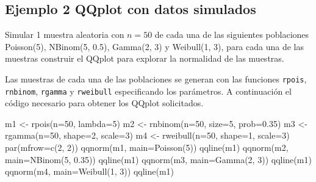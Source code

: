 \documentclass[
]{book}
\makeatletter
\newenvironment{Shaded}{\begin{snugshade}}{\end{snugshade}}
\newcommand{\AttributeTok}[1]{\textcolor[rgb]{0.77,0.63,0.00}{#1}}
\newcommand{\DecValTok}[1]{\textcolor[rgb]{0.00,0.00,0.81}{#1}}
\newcommand{\FloatTok}[1]{\textcolor[rgb]{0.00,0.00,0.81}{#1}}
\newcommand{\FunctionTok}[1]{\textcolor[rgb]{0.00,0.00,0.00}{#1}}
\newcommand{\NormalTok}[1]{#1}
\newcommand{\OtherTok}[1]{\textcolor[rgb]{0.56,0.35,0.01}{#1}}
\newcommand{\StringTok}[1]{\textcolor[rgb]{0.31,0.60,0.02}{#1}}
\newenvironment{kframe}{%
\medskip{}
\setlength{\fboxsep}{.8em}
 \def\at@end@of@kframe{}%
 \ifinner\ifhmode%
  \def\at@end@of@kframe{\end{minipage}}%
  \begin{minipage}{\columnwidth}%
 \fi\fi%
 \def\FrameCommand##1{\hskip\@totalleftmargin \hskip-\fboxsep
 \colorbox{shadecolor}{##1}\hskip-\fboxsep
     \hskip-\linewidth \hskip-\@totalleftmargin \hskip\columnwidth}%
 \MakeFramed {\advance\hsize-\width
   \@totalleftmargin\z@ \linewidth\hsize
   \@setminipage}}%
 {\par\unskip\endMakeFramed%
 \at@end@of@kframe}
\renewenvironment{Shaded}{\begin{kframe}}{\end{kframe}}
\makeatother
\begin{document}
\hypertarget{ejemplo-2-qqplot-con-datos-simulados}{%
\subsection*{Ejemplo 2 QQplot con datos simulados}\label{ejemplo-2-qqplot-con-datos-simulados}}

Simular 1 muestra aleatoria con \(n=50\) de cada una de las siguientes poblaciones Poisson(5), NBinom(5, 0.5), Gamma(2, 3) y Weibull(1, 3), para cada una de las muestras construir el QQplot para explorar la normalidad de las muestras.

Las muestras de cada una de las poblaciones se generan con las funciones \texttt{rpois}, \texttt{rnbinom}, \texttt{rgamma} y \texttt{rweibull} especificando los parámetros. A continuación el código necesario para obtener los QQplot solicitados.

\begin{Shaded}
\begin{Highlighting}[]
\NormalTok{m1 }\OtherTok{\textless{}{-}} \FunctionTok{rpois}\NormalTok{(}\AttributeTok{n=}\DecValTok{50}\NormalTok{, }\AttributeTok{lambda=}\DecValTok{5}\NormalTok{)}
\NormalTok{m2 }\OtherTok{\textless{}{-}} \FunctionTok{rnbinom}\NormalTok{(}\AttributeTok{n=}\DecValTok{50}\NormalTok{, }\AttributeTok{size=}\DecValTok{5}\NormalTok{, }\AttributeTok{prob=}\FloatTok{0.35}\NormalTok{)}
\NormalTok{m3 }\OtherTok{\textless{}{-}} \FunctionTok{rgamma}\NormalTok{(}\AttributeTok{n=}\DecValTok{50}\NormalTok{, }\AttributeTok{shape=}\DecValTok{2}\NormalTok{, }\AttributeTok{scale=}\DecValTok{3}\NormalTok{)}
\NormalTok{m4 }\OtherTok{\textless{}{-}} \FunctionTok{rweibull}\NormalTok{(}\AttributeTok{n=}\DecValTok{50}\NormalTok{, }\AttributeTok{shape=}\DecValTok{1}\NormalTok{, }\AttributeTok{scale=}\DecValTok{3}\NormalTok{)}
\FunctionTok{par}\NormalTok{(}\AttributeTok{mfrow=}\FunctionTok{c}\NormalTok{(}\DecValTok{2}\NormalTok{, }\DecValTok{2}\NormalTok{))}
\FunctionTok{qqnorm}\NormalTok{(m1, }\AttributeTok{main=}\StringTok{\textquotesingle{}Poisson(5)\textquotesingle{}}\NormalTok{)}
\FunctionTok{qqline}\NormalTok{(m1)}
\FunctionTok{qqnorm}\NormalTok{(m2, }\AttributeTok{main=}\StringTok{\textquotesingle{}NBinom(5, 0.35)\textquotesingle{}}\NormalTok{)}
\FunctionTok{qqline}\NormalTok{(m1)}
\FunctionTok{qqnorm}\NormalTok{(m3, }\AttributeTok{main=}\StringTok{\textquotesingle{}Gamma(2, 3)\textquotesingle{}}\NormalTok{)}
\FunctionTok{qqline}\NormalTok{(m1)}
\FunctionTok{qqnorm}\NormalTok{(m4, }\AttributeTok{main=}\StringTok{\textquotesingle{}Weibull(1, 3)\textquotesingle{}}\NormalTok{)}
\FunctionTok{qqline}\NormalTok{(m1)}
\end{Highlighting}
\end{Shaded}
\end{document}

